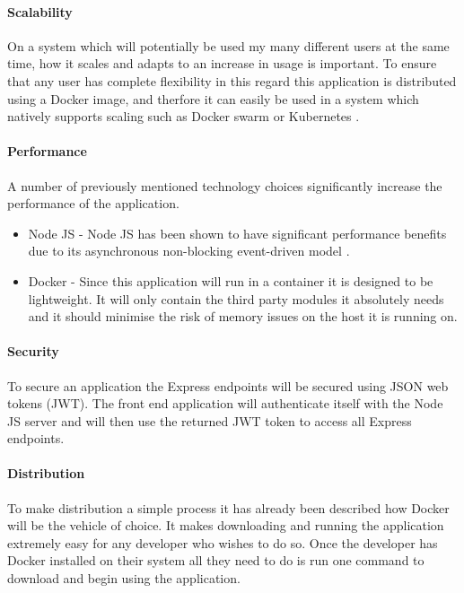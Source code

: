 \paragraph{Scalability}
On a system which will potentially be used my many different users at the same time, how it scales and adapts to an increase in usage is important. To ensure that any user has complete flexibility in this regard this application is distributed using a \gls{Docker image}, and therfore it can easily be used in a system which natively supports scaling such as Docker swarm or Kubernetes \citep{Kubernetes2017,DockerSwarm2017}.

\paragraph{Performance}
A number of previously mentioned technology choices significantly increase the performance of the application. 

\begin{itemize}
	\item Node JS - Node JS has been shown to have significant performance benefits due to its asynchronous non-blocking event-driven model \citep{NodePerformance2010}.
	\item Docker - Since this application will run in a container it is designed to be lightweight. It will only contain the third party modules it absolutely needs and it should minimise the risk of memory issues on the host it is running on.
\end{itemize}

\paragraph{Security}
To secure an application the Express endpoints will be secured using JSON web tokens (\gls{JWT}). The front end application will authenticate itself with the Node JS server and will then use the returned JWT token to access all Express endpoints. 

\paragraph{Distribution}
To make distribution a simple process it has already been described how \gls{Docker} will be the vehicle of choice. It makes downloading and running the application extremely easy for any developer who wishes to do so. Once the developer has Docker installed on their system all they need to do is run one command to download and begin using the application.

